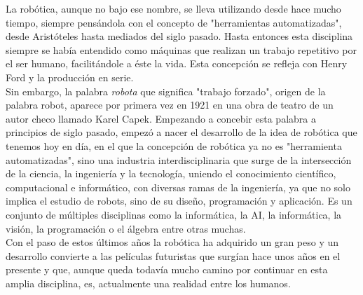 La robótica, aunque no bajo ese nombre, se lleva utilizando desde hace mucho tiempo, siempre pensándola con el concepto de "herramientas automatizadas", desde Aristóteles hasta mediados del siglo pasado. Hasta entonces esta disciplina siempre se había entendido como máquinas que realizan un trabajo repetitivo por el ser humano, facilitándole a éste la vida. Esta concepción se refleja con Henry Ford y la producción en serie.\\
Sin embargo, la palabra \textit{robota} que significa "trabajo forzado", origen de la palabra robot, aparece por primera vez en 1921 en una obra de teatro de un autor checo llamado Karel Capek. Empezando a concebir esta palabra a principios de siglo pasado, empezó a nacer el desarrollo de la idea de robótica que tenemos hoy en día, en el que la concepción de robótica ya no es "herramienta automatizadas", sino una industria interdisciplinaria que surge de la intersección de la ciencia, la ingeniería y la tecnología, uniendo el conocimiento científico, computacional e informático, con diversas ramas de la ingeniería, ya que no solo implica el estudio de robots, sino de su diseño, programación y aplicación. Es un conjunto de múltiples disciplinas como la informática, la AI, la informática, la visión, la programación o el álgebra entre otras muchas.\\
Con el paso de estos últimos años la robótica ha adquirido un gran peso y un desarrollo convierte a las películas futuristas que surgían hace unos años en el presente y que, aunque queda todavía mucho camino por continuar en esta amplia disciplina, es, actualmente una realidad entre los humanos.\\

